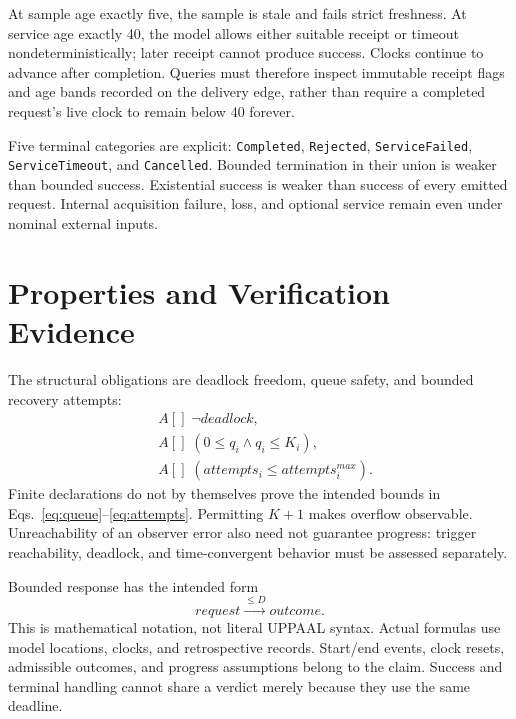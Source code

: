 \documentclass[runningheads]{llncs}
\newcommand{\code}[1]{\texttt{#1}}
\begin{document}
At sample age exactly five, the sample is stale and fails strict freshness. At service age exactly 40, the model allows either suitable receipt or timeout nondeterministically; later receipt cannot produce success. Clocks continue to advance after completion. Queries must therefore inspect immutable receipt flags and age bands recorded on the delivery edge, rather than require a completed request's live clock to remain below 40 forever.

Five terminal categories are explicit: \code{Completed}, \code{Rejected}, \code{ServiceFailed}, \code{ServiceTimeout}, and \code{Cancelled}. Bounded termination in their union is weaker than bounded success. Existential success is weaker than success of every emitted request. Internal acquisition failure, loss, and optional service remain even under nominal external inputs.

\section{Properties and Verification Evidence}\label{sec:verification}
The structural obligations are deadlock freedom, queue safety, and bounded recovery attempts:
\begin{align}
&A[]\;\neg deadlock,\label{eq:deadlock}\\
&A[]\;(0\le q_i\land q_i\le K_i),\label{eq:queue}\\
&A[]\;(attempts_i\le attempts_i^{max}).\label{eq:attempts}
\end{align}
Finite declarations do not by themselves prove the intended bounds in Eqs.~\ref{eq:queue}--\ref{eq:attempts}. Permitting $K+1$ makes overflow observable. Unreachability of an observer error also need not guarantee progress: trigger reachability, deadlock, and time-convergent behavior must be assessed separately.

Bounded response has the intended form
\begin{equation}
request\xrightarrow{\le D} outcome.
\end{equation}
This is mathematical notation, not literal UPPAAL syntax. Actual formulas use model locations, clocks, and retrospective records. Start/end events, clock resets, admissible outcomes, and progress assumptions belong to the claim. Success and terminal handling cannot share a verdict merely because they use the same deadline.
\end{document}
